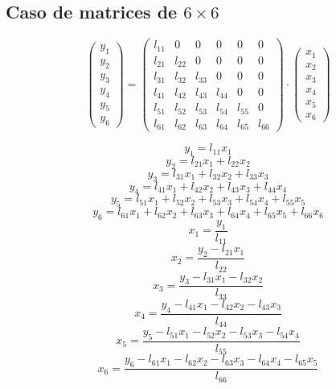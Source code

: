 \documentclass[10pt,a4paper,dvipdfmx]{article}
\begin{document}
\subsection{Caso de matrices de $6\times 6$ }
$$ \left( 
\begin{array}{c}
y_{1} \\
y_{2} \\
y_{3} \\
y_{4} \\
y_{5} \\
y_{6} 
 \end{array}
\right)
 = \left( 
\begin{array}{cccccc}
l_{{1}{1}} & 0 & 0 & 0 & 0 & 0 \\
l_{{2}{1}} & l_{{2}{2}} & 0 & 0 & 0 & 0 \\
l_{{3}{1}} & l_{{3}{2}} & l_{{3}{3}} & 0 & 0 & 0 \\
l_{{4}{1}} & l_{{4}{2}} & l_{{4}{3}} & l_{{4}{4}} & 0 & 0 \\
l_{{5}{1}} & l_{{5}{2}} & l_{{5}{3}} & l_{{5}{4}} & l_{{5}{5}} & 0 \\
l_{{6}{1}} & l_{{6}{2}} & l_{{6}{3}} & l_{{6}{4}} & l_{{6}{5}} & l_{{6}{6}} 
 \end{array}
\right)
 \cdot \left( 
\begin{array}{c}
x_{1} \\
x_{2} \\
x_{3} \\
x_{4} \\
x_{5} \\
x_{6} 
 \end{array}
\right)
 $$
\begin{multicols}{2}
$$ y_{1} = l_{{1}{1}} x_{1} $$
$$ y_{2} = l_{{2}{1}} x_{1} + l_{{2}{2}} x_{2} $$
$$ y_{3} = l_{{3}{1}} x_{1} + l_{{3}{2}} x_{2} + l_{{3}{3}} x_{3} $$
$$ y_{4} = l_{{4}{1}} x_{1} + l_{{4}{2}} x_{2} + l_{{4}{3}} x_{3} + l_{{4}{4}} x_{4} $$
$$ y_{5} = l_{{5}{1}} x_{1} + l_{{5}{2}} x_{2} + l_{{5}{3}} x_{3} + l_{{5}{4}} x_{4} + l_{{5}{5}} x_{5} $$
$$ y_{6} = l_{{6}{1}} x_{1} + l_{{6}{2}} x_{2} + l_{{6}{3}} x_{3} + l_{{6}{4}} x_{4} + l_{{6}{5}} x_{5} + l_{{6}{6}} x_{6} $$
\vfill\null
\columnbreak
$$ x_{1} = \dfrac{y_{1}}{l_{{1}{1}}} $$
$$ x_{2} = \dfrac{y_{2}- l_{{2}{1}} x_{1}}{l_{{2}{2}}} $$
$$ x_{3} = \dfrac{y_{3}- l_{{3}{1}} x_{1}- l_{{3}{2}} x_{2}}{l_{{3}{3}}} $$
$$ x_{4} = \dfrac{y_{4}- l_{{4}{1}} x_{1}- l_{{4}{2}} x_{2}- l_{{4}{3}} x_{3}}{l_{{4}{4}}} $$
$$ x_{5} = \dfrac{y_{5}- l_{{5}{1}} x_{1}- l_{{5}{2}} x_{2}- l_{{5}{3}} x_{3}- l_{{5}{4}} x_{4}}{l_{{5}{5}}} $$
$$ x_{6} = \dfrac{y_{6}- l_{{6}{1}} x_{1}- l_{{6}{2}} x_{2}- l_{{6}{3}} x_{3}- l_{{6}{4}} x_{4}- l_{{6}{5}} x_{5}}{l_{{6}{6}}} $$
\end{multicols}
\end{document}
